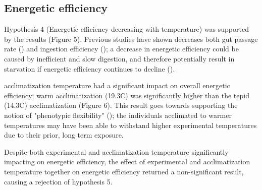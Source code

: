 \documentclass[../../Paper.tex]{subfiles}
\begin{document}
\subsection*{Energetic efficiency}

Hypothesis 4 (Energetic efficiency decreasing with temperature) was supported by the results (Figure 5). Previous 
studies have shown decreases both gut passage rate (\cite{mcconnachie_in_2004}) and ingestion efficiency 
(\cite{rall_temperature_2010}); a decrease in energetic efficiency could be caused by inefficient and slow digestion,
and therefore potentially result in starvation if energetic efficiency continues to decline (\cite{rall_temperature_2010,sentis_using_2012}). 

acclimatization temperature had a significant impact on overall energetic efficiency; warm acclimatization (19.3\degree C)
was significantly higher than the tepid (14.3\degree C) acclimatization (Figure 6). This result goes towards supporting the notion of "phenotypic 
flexibility" (\cite{piersma_phenotypic_2003,ahlgren_camouflaged_2013}); the individuals acclimated to warmer temperatures
may have been able to withstand higher experimental temperatures due to their prior, long term exposure. 

Despite both experimental and acclimatization temperature significantly impacting on energetic efficiency, the effect
of experimental and acclimatization temperature together on energetic efficiency returned a non-significant result,
causing a rejection of hypothesis 5. 
\end{document}
